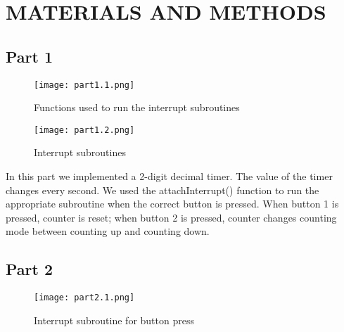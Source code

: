 \documentclass[pdftex,12pt,a4paper]{article}
\begin{document}
\section{MATERIALS AND METHODS}

\subsection{Part 1}
\begin{figure}[h]
	\centering
	\texttt{[image: part1.1.png]}	
	\caption{Functions used to run the interrupt subroutines}
	\label{fig1}
\end{figure}

\begin{figure}[h]
	\centering
	\texttt{[image: part1.2.png]}	
	\caption{Interrupt subroutines}
	\label{fig2}
\end{figure}

In this part we implemented a 2-digit decimal timer. The value of the timer changes every second. We used the attachInterrupt() function to run the appropriate subroutine when the correct button is pressed. When button 1 is pressed, counter is reset; when button 2 is pressed, counter changes counting mode between counting up and counting down.

\newpage
\subsection{Part 2}
\begin{figure}[h]
	\centering
	\texttt{[image: part2.1.png]}	
	\caption{Interrupt subroutine for button press}
	\label{fig3}
\end{figure}
\end{document}
